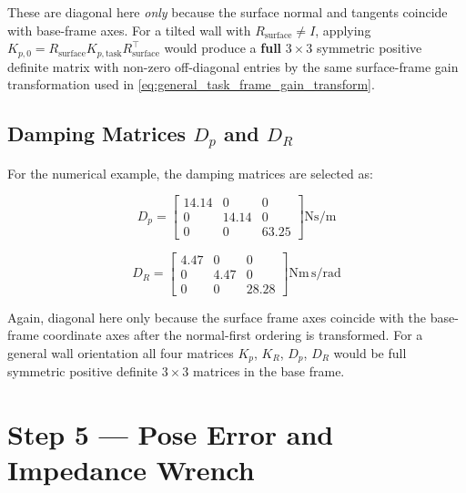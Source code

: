 These are diagonal here \emph{only} because the surface normal and tangents
coincide with base-frame axes.
For a tilted wall with \(R_{\mathrm{surface}}\neq I\), applying
\(K_{p,0}=R_{\mathrm{surface}}K_{p,\mathrm{task}}R_{\mathrm{surface}}^\top\)
would produce a \textbf{full} $3\times3$ symmetric positive definite matrix
with non-zero
off-diagonal entries by the same surface-frame gain transformation used in
\cref{eq:general_task_frame_gain_transform}.

\subsection{\texorpdfstring{Damping Matrices $D_p$ and $D_R$}{Damping Matrices Dp and DR}}

For the numerical example, the damping matrices are selected as:

\begin{equation}
\label{eq:D_panda}
D_p =
\begin{bmatrix}
14.14 & 0     & 0     \\
0     & 14.14 & 0     \\
0     & 0     & 63.25
\end{bmatrix}
\mathrm{Ns/m}
\end{equation}

\begin{equation}
\label{eq:DR_panda}
D_R =
\begin{bmatrix}
4.47 & 0    & 0     \\
0    & 4.47 & 0     \\
0    & 0    & 28.28
\end{bmatrix}
\mathrm{Nm\,s/rad}
\end{equation}

Again, diagonal here only because the surface frame axes coincide with the
base-frame coordinate axes after the normal-first ordering is transformed.
For a general wall orientation all four matrices $K_p$,
$K_R$, $D_p$, $D_R$ would be full symmetric positive definite
$3\times3$ matrices in the base frame.

\section{Step 5 --- Pose Error and Impedance Wrench}
\label{app:panda_force}

